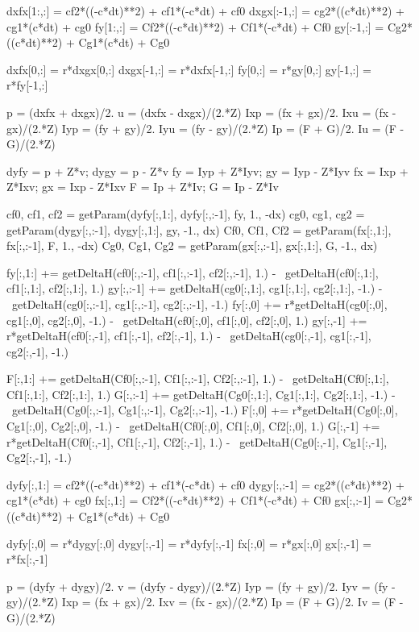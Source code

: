 \documentclass[dvipdfmx, 9pt, a4paper]{jsarticle}
\begin{document}
\begin{python}
	dxfx[1:,:] = cf2*((-c*dt)**2) + cf1*(-c*dt) + cf0
	dxgx[:-1,:] = cg2*((c*dt)**2) + cg1*(c*dt) + cg0
	fy[1:,:] = Cf2*((-c*dt)**2) + Cf1*(-c*dt) + Cf0
	gy[:-1,:] = Cg2*((c*dt)**2) + Cg1*(c*dt) + Cg0

	dxfx[0,:] = r*dxgx[0,:]
	dxgx[-1,:] = r*dxfx[-1,:]
	fy[0,:] = r*gy[0,:]
	gy[-1,:] = r*fy[-1,:]

	p = (dxfx + dxgx)/2.
	u = (dxfx - dxgx)/(2.*Z)
	Ixp = (fx + gx)/2.
	Ixu = (fx - gx)/(2.*Z)
	Iyp = (fy + gy)/2.
	Iyu = (fy - gy)/(2.*Z)
	Ip = (F + G)/2.
	Iu = (F - G)/(2.*Z)


	dyfy = p + Z*v; dygy = p - Z*v
	fy = Iyp + Z*Iyv; gy = Iyp - Z*Iyv
	fx = Ixp + Z*Ixv; gx = Ixp - Z*Ixv
	F = Ip + Z*Iv; G = Ip - Z*Iv

	cf0, cf1, cf2 = getParam(dyfy[:,1:], dyfy[:,:-1], fy, 1., -dx)
	cg0, cg1, cg2 = getParam(dygy[:,:-1], dygy[:,1:], gy, -1., dx)
	Cf0, Cf1, Cf2 = getParam(fx[:,1:], fx[:,:-1], F, 1., -dx)
	Cg0, Cg1, Cg2 = getParam(gx[:,:-1], gx[:,1:], G, -1., dx)

	fy[:,1:] += getDeltaH(cf0[:,:-1], cf1[:,:-1], cf2[:,:-1], 1.) - \
	getDeltaH(cf0[:,1:], cf1[:,1:], cf2[:,1:], 1.)
	gy[:,:-1] += getDeltaH(cg0[:,1:], cg1[:,1:], cg2[:,1:], -1.) - \
	getDeltaH(cg0[:,:-1], cg1[:,:-1], cg2[:,:-1], -1.)
	fy[:,0] += r*getDeltaH(cg0[:,0], cg1[:,0], cg2[:,0], -1.) - \
	getDeltaH(cf0[:,0], cf1[:,0], cf2[:,0], 1.)
	gy[:,-1] += r*getDeltaH(cf0[:,-1], cf1[:,-1], cf2[:,-1], 1.) - \
	getDeltaH(cg0[:,-1], cg1[:,-1], cg2[:,-1], -1.)

	F[:,1:] += getDeltaH(Cf0[:,:-1], Cf1[:,:-1], Cf2[:,:-1], 1.) - \
	getDeltaH(Cf0[:,1:], Cf1[:,1:], Cf2[:,1:], 1.)
	G[:,:-1] += getDeltaH(Cg0[:,1:], Cg1[:,1:], Cg2[:,1:], -1.) - \
	getDeltaH(Cg0[:,:-1], Cg1[:,:-1], Cg2[:,:-1], -1.)
	F[:,0] += r*getDeltaH(Cg0[:,0], Cg1[:,0], Cg2[:,0], -1.) - \
	getDeltaH(Cf0[:,0], Cf1[:,0], Cf2[:,0], 1.)
	G[:,-1] += r*getDeltaH(Cf0[:,-1], Cf1[:,-1], Cf2[:,-1], 1.) - \
	getDeltaH(Cg0[:,-1], Cg1[:,-1], Cg2[:,-1], -1.)

	dyfy[:,1:] = cf2*((-c*dt)**2) + cf1*(-c*dt) + cf0
	dygy[:,:-1] = cg2*((c*dt)**2) + cg1*(c*dt) + cg0
	fx[:,1:] = Cf2*((-c*dt)**2) + Cf1*(-c*dt) + Cf0
	gx[:,:-1] = Cg2*((c*dt)**2) + Cg1*(c*dt) + Cg0

	dyfy[:,0] = r*dygy[:,0]
	dygy[:,-1] = r*dyfy[:,-1]
	fx[:,0] = r*gx[:,0]
	gx[:,-1] = r*fx[:,-1]

	p = (dyfy + dygy)/2.
	v = (dyfy - dygy)/(2.*Z)
	Iyp = (fy + gy)/2.
	Iyv = (fy - gy)/(2.*Z)
	Ixp = (fx + gx)/2.
	Ixv = (fx - gx)/(2.*Z)
	Ip = (F + G)/2.
	Iv = (F - G)/(2.*Z)
\end{python}
\end{document}
